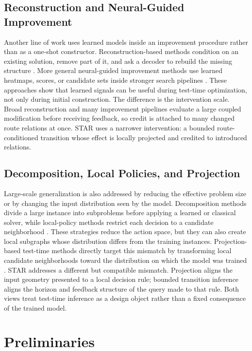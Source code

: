 \documentclass[11pt]{article}
\newcommand{\method}{\textsc{STAR}}
\begin{document}
\subsection{Reconstruction and Neural-Guided Improvement}

Another line of work uses learned models inside an improvement procedure rather than as a one-shot constructor. Reconstruction-based methods condition on an existing solution, remove part of it, and ask a decoder to rebuild the missing structure \citep{lehd,sil}. More general neural-guided improvement methods use learned heatmaps, scores, or candidate sets inside stronger search pipelines \citep{difusco,gfacs,neurolkh}. These approaches show that learned signals can be useful during test-time optimization, not only during initial construction. The difference is the intervention scale. Broad reconstruction and many improvement pipelines evaluate a large coupled modification before receiving feedback, so credit is attached to many changed route relations at once. \method{} uses a narrower intervention: a bounded route-conditioned transition whose effect is locally projected and credited to introduced relations.

\subsection{Decomposition, Local Policies, and Projection}

Large-scale generalization is also addressed by reducing the effective problem size or by changing the input distribution seen by the model. Decomposition methods divide a large instance into subproblems before applying a learned or classical solver, while local-policy methods restrict each decision to a candidate neighborhood \citep{learn2delegate,htsp,glop,invit}. These strategies reduce the action space, but they can also create local subgraphs whose distribution differs from the training instances. Projection-based test-time methods directly target this mismatch by transforming local candidate neighborhoods toward the distribution on which the model was trained \citep{ttpl}. \method{} addresses a different but compatible mismatch. Projection aligns the input geometry presented to a local decision rule; bounded transition inference aligns the horizon and feedback structure of the query made to that rule. Both views treat test-time inference as a design object rather than a fixed consequence of the trained model.

\section{Preliminaries}
\label{sec:prelim}
\end{document}
